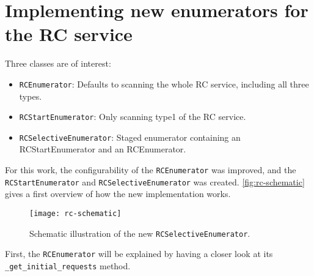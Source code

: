 
\section{Implementing new enumerators for the RC service}

Three classes are of interest:

\begin{itemize}
    \item \texttt{RCEnumerator}: Defaults to scanning the whole RC service, including all three types.
    \item \texttt{RCStartEnumerator}: Only scanning type1 of the RC service.
    \item \texttt{RCSelectiveEnumerator}: Staged enumerator containing an RCStartEnumerator and an RCEnumerator.
\end{itemize}

For this work, the configurability of the \texttt{RCEnumerator} was improved, and the \texttt{RCStartEnumerator} and \texttt{RCSelectiveEnumerator} was created. \autoref{fig:rc-schematic} gives a first overview of how the new implementation works.

\begin{figure}[htb]
    \centering
    \texttt{[image: rc-schematic]}
    \caption{Schematic illustration of the new \texttt{RCSelectiveEnumerator}.}
    \label{fig:rc-schematic}
\end{figure}

First, the \texttt{RCEnumerator} will be explained by having a closer look at its \texttt{_get_initial_requests} method.


